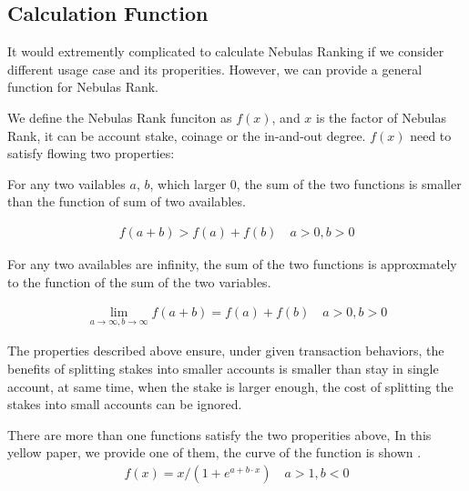\subsection{Calculation Function \label{sec:function}}
It would extremently complicated to calculate Nebulas Ranking if we consider different usage case and its properities. However, we can provide a general function for Nebulas Rank.

We define the Nebulas Rank funciton as \(f(x)\), and \(x\) is the factor of Nebulas Rank, it can be account stake, coinage or the in-and-out degree. $f(x)$ need to satisfy flowing two properties:

\begin{property}
\label{prop:one}
For any two vailables $a$, $b$, which larger $0$, the sum of the two functions is smaller than the function of sum of two availables.
\end{property}

\begin{align}
f(a+b)>f(a)+f(b) \quad a>0,b>0
\end{align}

\begin{property}
\label{prop:two}
For any two availables are infinity, the sum of the two functions is approxmately to the function of the sum of the two variables.
\end{property}

\begin{align}
\lim\limits_{a \to \infty, b\to \infty} f(a+b) = f(a) + f(b)\quad a>0, b>0
\end{align}

\noindent The properties described above ensure, under given transaction behaviors, the benefits of splitting stakes into smaller accounts is smaller than stay in single account, at same time, when the stake is larger enough, the cost of splitting the stakes into small accounts can be ignored. 

\noindent There are more than one functions satisfy the two properities above, In this yellow paper, we provide one of them, the curve of the function is shown .
\begin{align}
f(x) = x/(1 + e^{a + b\cdot x}) \quad a>1,b<0
\end{align}

